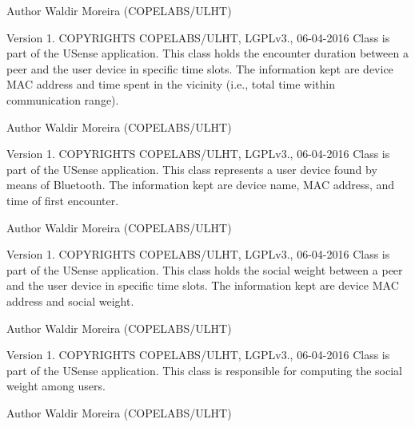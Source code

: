 \begin{DoxyAuthor}{Author}
Waldir Moreira (C\+O\+P\+E\+L\+A\+B\+S/\+U\+L\+H\+T)
\end{DoxyAuthor}
\begin{DoxyVersion}{Version}
1. C\+O\+P\+Y\+R\+I\+G\+H\+T\+S C\+O\+P\+E\+L\+A\+B\+S/\+U\+L\+H\+T, L\+G\+P\+Lv3., 06-\/04-\/2016 Class is part of the U\+Sense application. This class holds the encounter duration between a peer and the user device in specific time slots. The information kept are device M\+A\+C address and time spent in the vicinity (i.\+e., total time within communication range). 
\end{DoxyVersion}
\begin{DoxyAuthor}{Author}
Waldir Moreira (C\+O\+P\+E\+L\+A\+B\+S/\+U\+L\+H\+T)
\end{DoxyAuthor}
\begin{DoxyVersion}{Version}
1. C\+O\+P\+Y\+R\+I\+G\+H\+T\+S C\+O\+P\+E\+L\+A\+B\+S/\+U\+L\+H\+T, L\+G\+P\+Lv3., 06-\/04-\/2016 Class is part of the U\+Sense application. This class represents a user device found by means of Bluetooth. The information kept are device name, M\+A\+C address, and time of first encounter. 
\end{DoxyVersion}
\begin{DoxyAuthor}{Author}
Waldir Moreira (C\+O\+P\+E\+L\+A\+B\+S/\+U\+L\+H\+T)
\end{DoxyAuthor}
\begin{DoxyVersion}{Version}
1. C\+O\+P\+Y\+R\+I\+G\+H\+T\+S C\+O\+P\+E\+L\+A\+B\+S/\+U\+L\+H\+T, L\+G\+P\+Lv3., 06-\/04-\/2016 Class is part of the U\+Sense application. This class holds the social weight between a peer and the user device in specific time slots. The information kept are device M\+A\+C address and social weight. 
\end{DoxyVersion}
\begin{DoxyAuthor}{Author}
Waldir Moreira (C\+O\+P\+E\+L\+A\+B\+S/\+U\+L\+H\+T)
\end{DoxyAuthor}
\begin{DoxyVersion}{Version}
1. C\+O\+P\+Y\+R\+I\+G\+H\+T\+S C\+O\+P\+E\+L\+A\+B\+S/\+U\+L\+H\+T, L\+G\+P\+Lv3., 06-\/04-\/2016 Class is part of the U\+Sense application. This class is responsible for computing the social weight among users. 
\end{DoxyVersion}
\begin{DoxyAuthor}{Author}
Waldir Moreira (C\+O\+P\+E\+L\+A\+B\+S/\+U\+L\+H\+T) 
\end{DoxyAuthor}
